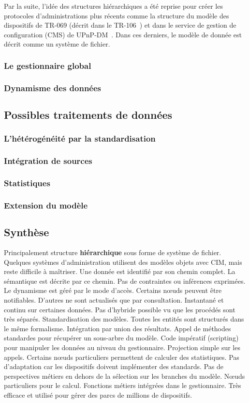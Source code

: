 Par la suite, l'idée des structures hiérarchiques a été reprise pour créer les protocoles d'administrations plus récents comme la structure du modèle des dispositifs de TR-069 (décrit dans le TR-106~\cite{BBF:tr106}) et dans le service de gestion de configuration (CMS) de UPnP-DM~\cite{UPnP:DMCMS}. Dans ces derniers, le modèle de donnée est décrit comme un système de fichier.
\subsubsection{Le gestionnaire global}
\subsubsection{Dynamisme des données}
\subsection{Possibles traitements de données}
\subsubsection{L'hétérogénéité par la standardisation}
\subsubsection{Intégration de sources}
\subsubsection{Statistiques}
\subsubsection{Extension du modèle}
\subsection{Synthèse}

\criteretabDonnee
    {Principalement structure \textbf{hiérarchique} sous forme de système de fichier. Quelques systèmes d'administration utilisent des modèles objets avec CIM, mais reste difficile à maîtriser.}
    {Une donnée est identifié par son chemin complet. La sémantique est décrite par ce chemin. Pas de contraintes ou inférences exprimées.}
    {Le dynamisme est géré par le mode d'accès. Certains nœuds peuvent être notifiables. D'autres ne sont actualisés que par consultation.}
\criteretabTraitement
    {Instantané et continu sur certaines données. Pas d'hybride possible vu que les procédés sont très séparés.}
    {Standardisation des modèles. Toutes les entités sont structurés dans le même formalisme. Intégration par union des résultats.}
    {Appel de méthodes standardes pour récupérer un sous-arbre du modèle. Code impératif (scripting) pour manipuler les données au niveau du gestionnaire.}
    {Projection simple sur les appels. Certains nœuds particuliers permettent de calculer des statistiques.}
\criteretabAdaptabilite
    {Pas d'adaptation car les dispositifs doivent implémenter des standards.}
    {Pas de perspectives métiers en dehors de la sélection sur les branches du modèle.}
    {Nœuds particuliers pour le calcul. Fonctions métiers intégrées dans le gestionnaire.}
    {Très efficace et utilisé pour gérer des parcs de millions de dispositifs.}